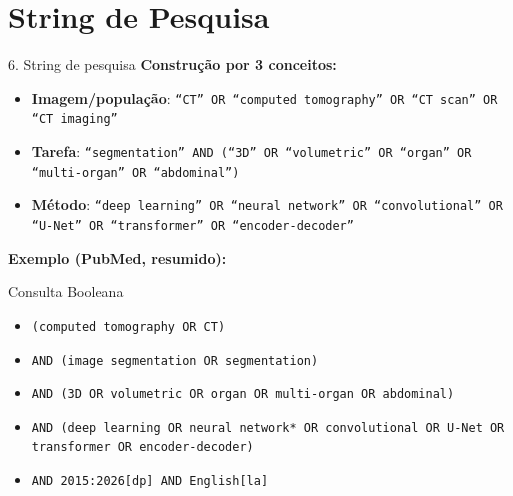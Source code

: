 \documentclass[aspectratio=169]{beamer}
\begin{document}
\section{String de Pesquisa}
\begin{frame}{6. String de pesquisa}
\small
\textbf{Construção por 3 conceitos:}
\begin{itemize}
	\item \textbf{Imagem/população}: \texttt{``CT'' OR ``computed tomography'' OR ``CT scan'' OR ``CT imaging''}
	\item \textbf{Tarefa}: \texttt{``segmentation'' AND (``3D'' OR ``volumetric'' OR ``organ'' OR ``multi-organ'' OR ``abdominal'')}
	\item \textbf{Método}: \texttt{``deep learning'' OR ``neural network'' OR ``convolutional'' OR ``U-Net'' OR ``transformer'' OR ``encoder-decoder''}
\end{itemize}

\textbf{Exemplo (PubMed, resumido):}
\begin{block}{Consulta Booleana}
\scriptsize
\begin{itemize}
	\item \texttt{(computed tomography OR CT)}
	\item \texttt{AND (image segmentation OR segmentation)}
	\item \texttt{AND (3D OR volumetric OR organ OR multi-organ OR abdominal)}
	\item \texttt{AND (deep learning OR neural network* OR convolutional OR U-Net OR transformer OR encoder-decoder)}
	\item \texttt{AND 2015:2026[dp] AND English[la]}
\end{itemize}
\end{block}
\end{frame}
\end{document}
